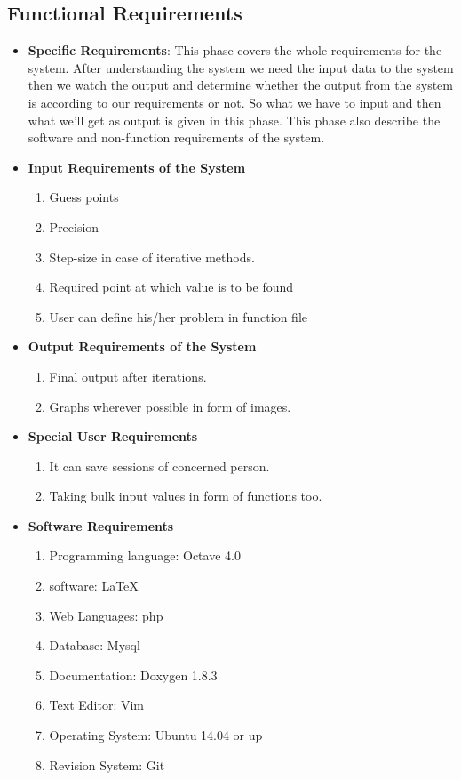\subsection{Functional Requirements}
\begin{itemize}
\item {\bf Specific Requirements}: This phase covers the whole requirements 
for the system. After understanding the system we need the input data 
to the system then we watch the output and determine whether the output 
from the system is according to our requirements or not. So what we have 
to input and then what we'll get as output is given in this phase. This 
phase also describe the software and non-function requirements of the 
system.
\item {\bf Input Requirements of the System}
\begin{enumerate} 
\item Guess points
\item Precision
\item Step-size in case of iterative methods.
\item Required point at which value is to be found
\item User can define his/her problem in function file
\end{enumerate}
\vskip 0.5cm
\item {\bf Output Requirements of the System}
\begin{enumerate} 
\item Final output after iterations.
\item Graphs wherever possible in form of images. 
\end{enumerate}
\vskip 0.5cm
\item {\bf Special User Requirements}
\begin{enumerate} 
\item It can save sessions of concerned person.
\item Taking bulk input values in form of functions too.
\end{enumerate}
\vskip 0.5cm
\item {\bf Software Requirements}
\begin{enumerate} 
\item Programming language: Octave 4.0
\item software: \LaTeX{}
\item Web Languages: php
\item Database: Mysql 
\item Documentation: Doxygen 1.8.3
\item Text Editor: Vim
\item Operating System: Ubuntu 14.04 or up
\item Revision System: Git


\end{enumerate}
\end{itemize}

